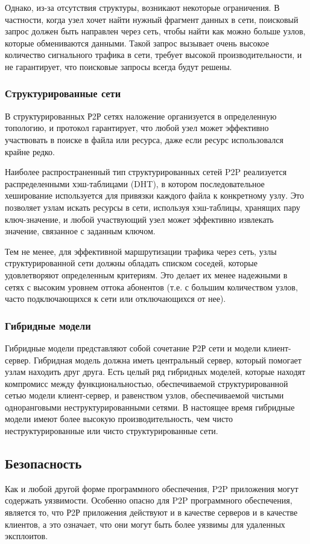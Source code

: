 \documentclass[bachelor, och, coursework]{SCWorks}
\begin{document}
Однако, из-за отсутствия структуры, возникают некоторые ограничения. В частности, когда узел хочет найти нужный фрагмент данных в сети, поисковый запрос должен быть направлен через сеть, чтобы найти как можно больше узлов, которые обмениваются данными. Такой запрос вызывает очень высокое количество сигнального трафика в сети, требует высокой производительности, и не гарантирует, что поисковые запросы всегда будут решены.

\subsubsection{Структурированные сети}
В структурированных Р2Р сетях наложение организуется в определенную топологию, и протокол гарантирует, что любой узел может эффективно участвовать в поиске в файла или ресурса, даже если ресурс использовался крайне редко.

Наиболее распространенный тип структурированных сетей P2P реализуется распределенными хэш-таблицами (DHT), в котором последовательное хеширование используется для привязки каждого файла к конкретному узлу. Это позволяет узлам искать ресурсы в сети, используя хэш-таблицы, хранящих пару ключ-значение, и любой участвующий узел может эффективно извлекать значение, связанное с заданным ключом.

Тем не менее, для эффективной маршрутизации трафика через сеть, узлы структурированной сети должны обладать списком соседей, которые удовлетворяют определенным критериям. Это делает их менее надежными в сетях с высоким уровнем оттока абонентов (т.е. с большим количеством узлов, часто подключающихся к сети или отключающихся от нее).

\subsubsection{Гибридные модели}
Гибридные модели представляют собой сочетание Р2Р сети и модели клиент-сервер. Гибридная модель должна иметь центральный сервер, который помогает узлам находить друг друга. Есть целый ряд гибридных моделей, которые находят компромисс между функциональностью, обеспечиваемой структурированной сетью модели клиент-сервер, и равенством узлов, обеспечиваемой чистыми одноранговыми неструктурированными сетями. В настоящее время гибридные модели имеют более высокую производительность, чем чисто неструктурированные или чисто структурированные сети.

\subsection{Безопасность}
Как и любой другой форме программного обеспечения, P2P приложения могут содержать уязвимости. Особенно опасно для P2P программного обеспечения, является то, что Р2Р приложения действуют и в качестве серверов и в качестве клиентов, а это означает, что они могут быть более уязвимы для удаленных эксплоитов.
\end{document}
